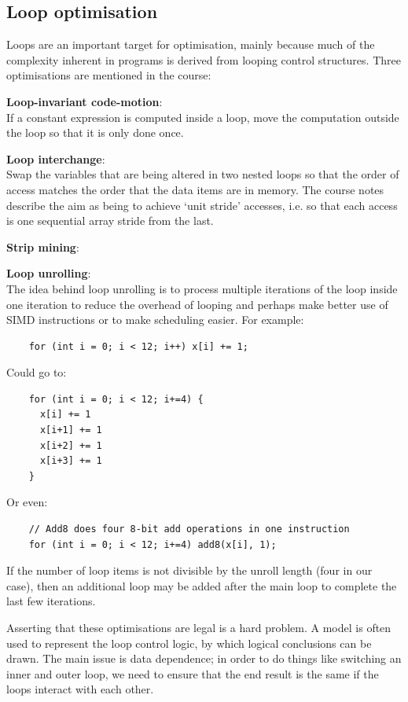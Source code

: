 \subsection{Loop optimisation}

Loops are an important target for optimisation, mainly because much of
the complexity inherent in programs is derived from looping control
structures. Three optimisations are mentioned in the course:

\begin{description}
  \item \textbf{Loop-invariant code-motion}:\\ If a constant
    expression is computed inside a loop, move the computation outside
    the loop so that it is only done once.
    
  \item \textbf{Loop interchange}:\\ Swap the variables that are being
  altered in two nested loops so that the order of access matches the
  order that the data items are in memory. The course notes describe
  the aim as being to achieve `unit stride' accesses, i.e. so that
  each access is one sequential array stride from the last.

  \item \textbf{Strip mining}:\\

  \item \textbf{Loop unrolling}:\\ The idea behind loop unrolling is
  to process multiple iterations of the loop inside one iteration to
  reduce the overhead of looping and perhaps make better use of SIMD
  instructions or to make scheduling easier. For example:
  
  \begin{verbatim}
    for (int i = 0; i < 12; i++) x[i] += 1;
  \end{verbatim}

  Could go to:

  \begin{verbatim}
    for (int i = 0; i < 12; i+=4) {
      x[i] += 1
      x[i+1] += 1
      x[i+2] += 1
      x[i+3] += 1
    }
  \end{verbatim}

  Or even:

  \begin{verbatim}
    // Add8 does four 8-bit add operations in one instruction
    for (int i = 0; i < 12; i+=4) add8(x[i], 1);
  \end{verbatim}

  If the number of loop items is not divisible by the unroll length
  (four in our case), then an additional loop may be added after the
  main loop to complete the last few iterations.
\end{description}

Asserting that these optimisations are legal is a hard problem. A
model is often used to represent the loop control logic, by which
logical conclusions can be drawn. The main issue is data dependence;
in order to do things like switching an inner and outer loop, we need
to ensure that the end result is the same if the loops interact with
each other.

